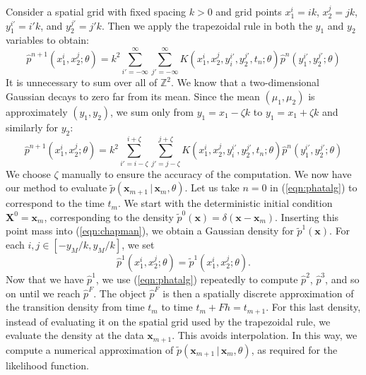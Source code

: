 \documentclass[graybox]{svmult}
\begin{document}
Consider a spatial grid with fixed spacing $k > 0$ and grid points $x_1^i = ik$, $x_2^j = jk$, $y_1^{i'} = i'k$, and $y_2^{j'} = j'k$.  Then we apply the trapezoidal rule in both the $y_1$ and $y_2$ variables to obtain:
\begin{equation}
\hat{p}^{n+1}(x_1^i, x_2^j ;\theta) = k^2 \sum\limits_{i' = -\infty}^{\infty} \sum\limits_{j' = -\infty}^{\infty} K(x_1^i, x_2^j, y_i^{i'}, y_2^{j'},t_n; \theta)  \hat{p}^n(y_1^{i'}, y_2^{j'}; \theta)
\end{equation}
It is unnecessary to sum over all of $\mathbb{Z}^2$.  We know that a two-dimensional Gaussian decays to zero far from its mean.  Since the mean $(\mu_1,\mu_2)$ is approximately $(y_1,y_2)$, we sum only from $y_1 = x_1 - \zeta k$ to $y_1 = x_1 + \zeta k$ and similarly for $y_2$:
\begin{equation}
\label{eqn:phatalg}
\hat{p}^{n+1}(x_1^i, x_2^j;\theta ) = k^2 \sum\limits_{i' = i - \zeta}^{i+ \zeta} \sum\limits_{j' = j-\zeta}^{j+\zeta} K(x_1^i, x_2^j, y_i^{i'}, y_2^{j'},t_n; \theta) \hat{p}^n(y_1^{i'}, y_2^{j'}; \theta)
\end{equation}
We choose $\zeta$ manually to ensure the accuracy of the computation.
We now have our method to evaluate $\widetilde{p}(\mathbf{x}_{m+1} \, | \, \mathbf{x}_m, \theta)$.  Let us take $n=0$ in (\ref{eqn:phatalg}) to correspond to the time $t_m$.  We start with the deterministic initial condition $\mathbf{X}^0 = \mathbf{x}_m$, corresponding to the density $\widetilde{p}^0(\mathbf{x}) = \delta(\mathbf{x} - \mathbf{x}_m)$.  Inserting this point mass into (\ref{eqn:chapman}), we obtain a Gaussian density for $\widetilde{p}^1(\mathbf{x})$.  For each $i,j \in [-y_M/k, y_M/k]$, we set
$$
\hat{p}^1(x_1^i, x_2^j; \theta) = \widetilde{p}^1(x_1^i, x_2^j; \theta).
$$
Now that we have $\hat{p}^1$, we use (\ref{eqn:phatalg}) repeatedly to
compute $\hat{p}^2$, $\hat{p}^3$, and so on until we reach
$\hat{p}^F$.  The object $\hat{p}^F$ is then a spatially discrete
approximation of the transition density from time $t_m$ to time $t_m +
Fh = t_{m+1}$.  For this last density, instead of evaluating it on the
spatial grid used by the trapezoidal rule, we evaluate the density at
the data $\mathbf{x}_{m+1}$.  This avoids interpolation.  In this way,
we compute a numerical approximation of $\widetilde{p}(\mathbf{x}_{m+1} \, | \, \mathbf{x}_m, \theta)$, as required for the likelihood function.
\end{document}

